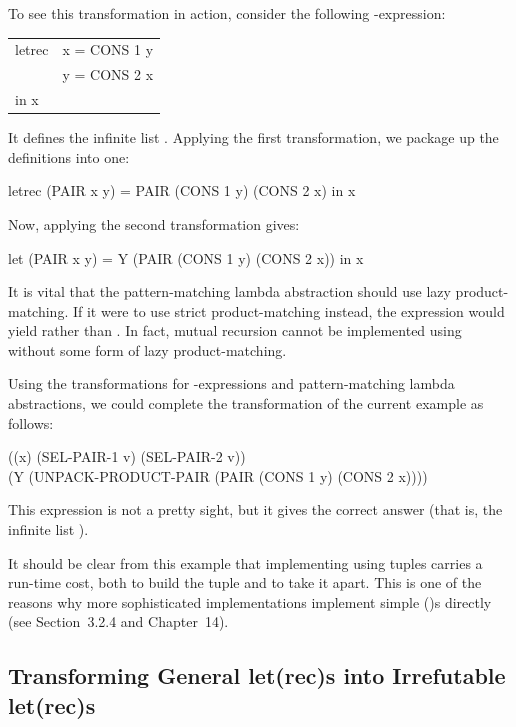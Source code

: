 {To see this transformation in action, consider the following -expression:
\begin{mlcoded}
	\begin{tabular}{ll}
		letrec &x = CONS 1 y\\
		&y = CONS 2 x\\
		in x&
	\end{tabular}
\end{mlcoded}
It defines the infinite list \ml{[1,2,1,2, \ldots]}. Applying the first transformation, we
package up the definitions into one:
\begin{mlcoded}
		letrec (PAIR x y) = PAIR (CONS 1 y) (CONS 2 x) in x
\end{mlcoded}
Now, applying the second transformation gives:
\begin{mlcoded}
		let (PAIR x y) = Y (PAIR (CONS 1 y) (CONS 2 x)) in x
\end{mlcoded}
It is vital that the pattern-matching lambda abstraction should use lazy
product-matching. If it were to use strict product-matching instead, the
expression would yield  rather than \ml{[1, 2, 1, 2, \ldots]}. In fact, mutual recursion
cannot be implemented using  without some form of lazy product-matching.

Using the transformations for -expressions and pattern-matching lambda
abstractions, we could complete the transformation of the current example as
follows:
\begin{mlcoded}
((x) (SEL-PAIR-1 v) (SEL-PAIR-2 v)) \\
(Y (UNPACK-PRODUCT-PAIR (PAIR (CONS 1 y) (CONS 2 x))))
\end{mlcoded}
This expression is not a pretty sight, but it gives the correct answer (that is, the
infinite list \ml{[1, 2, 1, 2, 1, 2, \ldots]}).

It should be clear from this example that implementing  using tuples
carries a run-time cost, both to build the tuple and to take it apart. This is one
of the reasons why more sophisticated implementations implement simple
()s directly (see Section~3.2.4 and Chapter~14).

\subsection{Transforming General let(rec)s into Irrefutable let(rec)s}

}
